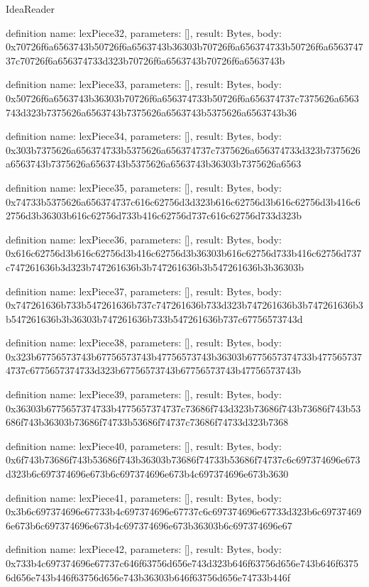\begin{lexlean}{IdeaReader}
\begin{semanticmodule}
definition{
  name: lexPiece32,
  parameters: [],
  result: Bytes,
  body: 0x70726f6a6563743b50726f6a6563743b36303b70726f6a656374733b50726f6a656374737c70726f6a656374733d323b70726f6a6563743b70726f6a6563743b
}

definition{
  name: lexPiece33,
  parameters: [],
  result: Bytes,
  body: 0x50726f6a6563743b36303b70726f6a656374733b50726f6a656374737c7375626a6563743d323b7375626a6563743b7375626a6563743b5375626a6563743b36
}

definition{
  name: lexPiece34,
  parameters: [],
  result: Bytes,
  body: 0x303b7375626a656374733b5375626a656374737c7375626a656374733d323b7375626a6563743b7375626a6563743b5375626a6563743b36303b7375626a6563
}

definition{
  name: lexPiece35,
  parameters: [],
  result: Bytes,
  body: 0x74733b5375626a656374737c616c62756d3d323b616c62756d3b616c62756d3b416c62756d3b36303b616c62756d733b416c62756d737c616c62756d733d323b
}

definition{
  name: lexPiece36,
  parameters: [],
  result: Bytes,
  body: 0x616c62756d3b616c62756d3b416c62756d3b36303b616c62756d733b416c62756d737c747261636b3d323b747261636b3b747261636b3b547261636b3b36303b
}

definition{
  name: lexPiece37,
  parameters: [],
  result: Bytes,
  body: 0x747261636b733b547261636b737c747261636b733d323b747261636b3b747261636b3b547261636b3b36303b747261636b733b547261636b737c67756573743d
}

definition{
  name: lexPiece38,
  parameters: [],
  result: Bytes,
  body: 0x323b67756573743b67756573743b47756573743b36303b6775657374733b4775657374737c6775657374733d323b67756573743b67756573743b47756573743b
}

definition{
  name: lexPiece39,
  parameters: [],
  result: Bytes,
  body: 0x36303b6775657374733b4775657374737c73686f743d323b73686f743b73686f743b53686f743b36303b73686f74733b53686f74737c73686f74733d323b7368
}

definition{
  name: lexPiece40,
  parameters: [],
  result: Bytes,
  body: 0x6f743b73686f743b53686f743b36303b73686f74733b53686f74737c6c697374696e673d323b6c697374696e673b6c697374696e673b4c697374696e673b3630
}

definition{
  name: lexPiece41,
  parameters: [],
  result: Bytes,
  body: 0x3b6c697374696e67733b4c697374696e67737c6c697374696e67733d323b6c697374696e673b6c697374696e673b4c697374696e673b36303b6c697374696e67
}

definition{
  name: lexPiece42,
  parameters: [],
  result: Bytes,
  body: 0x733b4c697374696e67737c646f63756d656e743d323b646f63756d656e743b646f63756d656e743b446f63756d656e743b36303b646f63756d656e74733b446f
}


\end{semanticmodule}
\end{lexlean}
